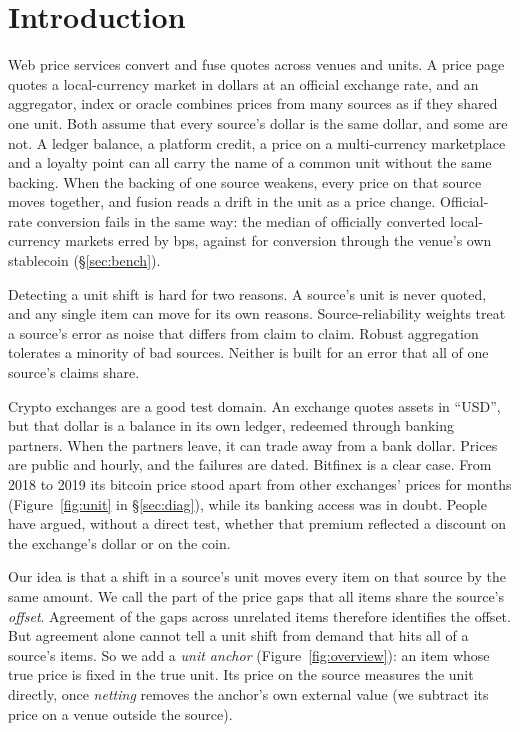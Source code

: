 \documentclass[sigconf,review,anonymous]{acmart}
\begin{document}
\maketitle

\section{Introduction}
Web price services convert and fuse quotes across venues and units. A price page quotes a local-currency market in dollars at an
official exchange rate, and an aggregator, index or oracle combines prices from many sources as if they shared one unit. Both
assume that every source's dollar is the same dollar, and some are not. A ledger balance, a platform credit, a price on a
multi-currency marketplace and a loyalty point can all carry the name of a common unit without the same backing. When the
backing of one source weakens, every price on that source moves together, and fusion reads a drift in the unit as a price change. Official-rate
conversion fails in the same way: the median of officially converted local-currency markets erred by \NumPFFusMOMae{} bps, against \NumPFFusMAMae{} for
conversion through the venue's own stablecoin (\S\ref{sec:bench}).

Detecting a unit shift is hard for two reasons. A source's unit is never quoted, and any single item can move
for its own reasons. Source-reliability weights treat a source's error as noise that differs from claim to claim.
Robust aggregation tolerates a minority of bad sources. Neither is built for an error that all of one source's claims share.

Crypto exchanges are a good test domain. An exchange quotes assets in ``USD'', but that dollar is a balance in its own
ledger, redeemed through banking partners. When the partners leave, it can trade away from a bank dollar. Prices are
public and hourly, and the failures are dated. Bitfinex is a clear case. From 2018 to 2019 its bitcoin price stood
apart from other exchanges' prices for months (Figure~\ref{fig:unit} in \S\ref{sec:diag}), while its banking access was in doubt.
People have argued, without a direct test, whether that premium reflected a discount on the exchange's dollar or on the coin.

Our idea is that a shift in a source's unit moves every item on that source by the same amount. We call the part of the
price gaps that all items share the source's \emph{offset}. Agreement of the gaps across unrelated items therefore
identifies the offset. But agreement alone cannot tell a unit shift from demand that hits all of a source's items. So we add a
\emph{unit anchor} (Figure~\ref{fig:overview}): an item whose true price is fixed in the true unit. Its price on the source measures the unit directly,
once \emph{netting} removes the anchor's own external value (we subtract its price on a venue outside the source).
\end{document}
